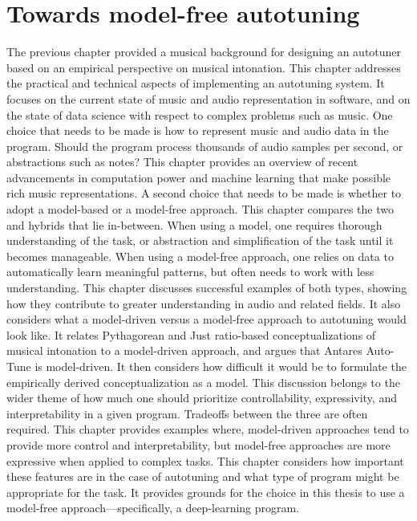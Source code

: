 \chapter{Towards model-free autotuning}
\label{chap:tech-background}
The previous chapter provided a musical background for designing an autotuner based on an empirical perspective on musical intonation. This chapter addresses the practical and technical aspects of implementing an autotuning system. It focuses on the current state of music and audio representation in software, and on the state of data science with respect to complex problems such as music. One choice that needs to be made is how to represent music and audio data in the program. Should the program process thousands of audio samples per second, or abstractions such as notes? This chapter provides an overview of recent advancements in computation power and machine learning that make possible rich music representations. A second choice that needs to be made is whether to adopt a model-based or a model-free approach. This chapter compares the two and hybrids that lie in-between. When using a model, one requires thorough understanding of the task, or abstraction and simplification of the task until it becomes manageable. When using a model-free approach, one relies on data to automatically learn meaningful patterns, but often needs to work with less understanding. This chapter discusses successful examples of both types, showing how they contribute to greater understanding in audio and related fields. It also considers what a model-driven versus a model-free approach to autotuning would look like. It relates Pythagorean and Just ratio-based conceptualizations of musical intonation to a model-driven approach, and argues that Antares Auto-Tune is model-driven. It then considers how difficult it would be to formulate the empirically derived conceptualization as a model. This discussion belongs to the wider theme of how much one should prioritize controllability, expressivity, and interpretability in a given program. Tradeoffs between the three are often required. This chapter provides examples where, model-driven approaches tend to provide more control and interpretability, but model-free approaches are more expressive when applied to complex tasks. This chapter considers how important these features are in the case of autotuning and what type of program might be appropriate for the task. It provides grounds for the choice in this thesis to use a model-free approach---specifically, a deep-learning program. 

